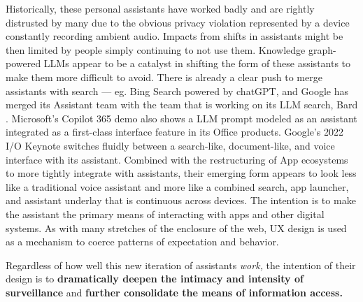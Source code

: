 Historically, these personal assistants have worked badly
and are rightly distrusted by many
due to the obvious privacy violation represented by a device constantly
recording ambient audio.
Impacts from shifts in assistants might be then limited by people simply
continuing to not use them. Knowledge graph-powered LLMs appear to be a
catalyst in shifting the form of these assistants to make them more
difficult to avoid. There is already a clear push to merge assistants
with search --- eg. Bing Search powered by chatGPT, and Google has
merged its Assistant team with the team that is working on its LLM
search, Bard \cite{eliasGoogleReshufflesVirtual2023} .
Microsoft's Copilot 365 demo also shows a LLM prompt modeled as an
assistant integrated as a first-class interface feature in its Office
products. Google's 2022 I/O Keynote switches fluidly between a
search-like, document-like, and voice interface with its assistant.
Combined with the restructuring of App ecosystems to more tightly
integrate with assistants, their emerging form appears to look less like
a traditional voice assistant and more like a combined search, app
launcher, and assistant underlay that is continuous across devices. The
intention is to make the assistant the primary means of interacting with
apps and other digital systems. As with many stretches of the enclosure
of the web, UX design is used as a mechanism to coerce patterns of
expectation and behavior.

Regardless of how well this new iteration of assistants \emph{work,} the
intention of their design is to \textbf{dramatically deepen the intimacy
and intensity of surveillance} and \textbf{further consolidate the means
of information access.}

